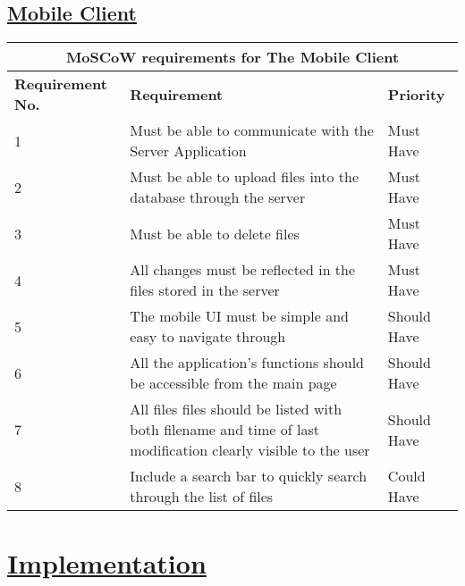 \documentclass{article}
\begin{document}
\subsection{\underline{Mobile Client}}
\begin{tabular}{|p{3cm}|p{5cm}|p{4cm}|}
\hline
\multicolumn{3}{|c|}{\textbf{MoSCoW requirements for The Mobile Client}} \\
\hline
\textbf{Requirement No.} & \textbf{Requirement} & \textbf{Priority}\\
\hline
1 & Must be able to communicate with the Server Application & Must Have \\
\hline
2 & Must be able to upload files into the database through the server & Must Have \\
\hline
3 & Must be able to delete files & Must Have \\
\hline
4 & All changes must be reflected in the files stored in the server & Must Have \\
\hline
5 & The mobile UI must be simple and easy to navigate through & Should Have \\
\hline
6 & All the application's functions should be accessible from the main page & Should Have \\
\hline
7 & All files files should be listed with both filename and time of last modification clearly visible to the user & Should Have \\
\hline
8 & Include a search bar to quickly search through the list of files & Could Have \\
\hline
\end{tabular}

\section{\underline{Implementation}}
\end{document}

